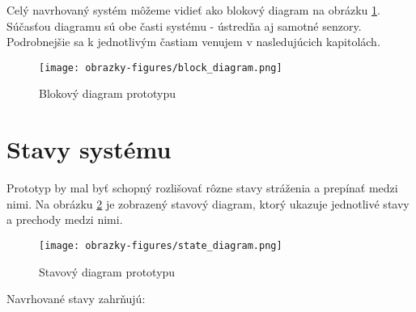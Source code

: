 Celý navrhovaný systém môžeme vidieť ako blokový diagram na obrázku \ref{fig:navrh_diagram}. Súčasťou diagramu sú obe časti systému - ústredňa aj samotné senzory. Podrobnejšie sa k jednotlivým častiam venujem v nasledujúcich kapitolách.

\begin{figure}[ht]
    \centering
    \texttt{[image: obrazky-figures/block\_diagram.png]}
    \caption{Blokový diagram prototypu}
    \label{fig:navrh_diagram}
\end{figure}

\section{Stavy systému}

Prototyp by mal byť schopný rozlišovať rôzne stavy stráženia a prepínať medzi nimi. Na obrázku \ref{fig:state_diagram} je zobrazený stavový diagram, ktorý ukazuje jednotlivé stavy a prechody medzi nimi.

\begin{figure}[ht]
    \centering
    \texttt{[image: obrazky-figures/state\_diagram.png]}
    \caption{Stavový diagram prototypu}
    \label{fig:state_diagram}
\end{figure}

Navrhované stavy zahrňujú:

